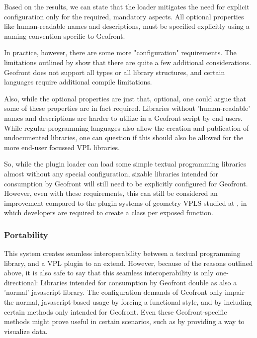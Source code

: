 Based on the results, we can state that the loader mitigates the need for explicit configuration only for the required, mandatory aspects. 
All optional properties like human-readable names and descriptions, must be specified explicitly using a naming convention specific to Geofront. 

In practice, however, there are some more "configuration" requirements. 
The limitations outlined by  show that there are quite a few additional considerations. 
Geofront does not support all types or all library structures, and certain languages require additional compile limitations.

Also, while the optional properties are just that, optional, one could argue that some of these properties are in fact required. 
Libraries without 'human-readable' names and descriptions are harder to utilize in a Geofront script by end users.
While regular programming languages also allow the creation and publication of undocumented libraries, one can question if this should also be allowed for the more end-user focussed VPL libraries.

So, while the plugin loader can load some simple textual programming libraries almost without any special configuration, sizable libraries intended for consumption by Geofront will still need to be explicitly configured for Geofront.
However, even with these requirements, this can still be considered an improvement compared to the plugin systems of geometry VPLS studied at , 
in which developers are required to create a class per exposed function.

\subsubsection{Portability}

This system creates seamless interoperability between a textual programming library, and a VPL plugin to an extend. 
However, because of the reasons outlined above, it is also safe to say that this seamless interoperability is only one-directional: 
Libraries intended for consumption by Geofront double as also a 'normal' javascript library. 
The configuration demands of Geofront only impair the normal, javascript-based usage by forcing a functional style, and by including certain methods only intended for Geofront. 
Even these Geofront-specific methods might prove useful in certain scenarios, such as by providing a way to visualize data.

